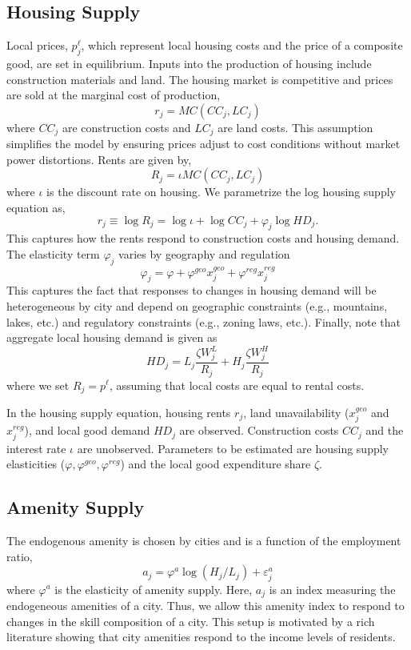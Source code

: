 \documentclass{article}
\begin{document}
\subsection{Housing Supply}
Local prices, $p^\ell_{j}$, which represent local housing costs and the price of a composite good, are set in equilibrium. Inputs into the production of housing include construction materials and land. The housing market is competitive and prices are sold at the marginal cost of production,
$$r_{j} = MC(CC_{j}, LC_{j})$$
where $CC_{j}$ are construction costs and $LC_{j}$ are land costs. This assumption simplifies the model by ensuring prices adjust to cost conditions without market power distortions. Rents are given by,
$$R_{j} = \iota MC(CC_{j},LC_{j})$$
where $\iota$ is the discount rate on housing. We parametrize the log housing supply equation as,
\begin{equation}\label{eq: housing supply}
    r_{j} \equiv \log R_{j} = \log \iota + \log CC_{j} + \varphi_j \log HD_{j}.
\end{equation}
This captures how the rents respond to construction costs and housing demand. The elasticity term $\varphi_j$ varies by geography and regulation
$$\varphi_j = \varphi + \varphi^{geo}x_j^{geo} + \varphi^{reg} x_j^{reg}$$
This captures the fact that responses to changes in housing demand will be heterogeneous by city and depend on geographic constraints (e.g., mountains, lakes, etc.) and regulatory constraints (e.g., zoning laws, etc.). 
Finally, note that aggregate local housing demand is given as
\begin{equation} \label{eq: housing demand}
HD_{j} = L_{j} \frac{\zeta W_{j}^L}{R_{j}} + H_{j} \frac{\zeta W_{j}^H}{R_{j}}
\end{equation}
where we set $R_{j} = p^\ell$, assuming that local costs are equal to rental costs.

In the housing supply equation, housing rents $r_{j}$, land unavailability ($x^{geo}_j$ and $x^{reg}_j$), and local good demand $HD_{j}$ are observed. Construction costs $CC_{j}$ and the interest rate $\iota$ are unobserved. Parameters to be estimated are housing supply elasticities ($\varphi, \varphi^{geo}, \varphi^{reg}$) and the local good expenditure share $\zeta$.   

\subsection{Amenity Supply}
The endogenous amenity is chosen by cities and is a function of the employment ratio,
\begin{equation}\label{eq: amenity supply} 
a_{j} = \varphi^a \log(H_{j}/L_{j}) + \varepsilon^a_{j} \end{equation}
where $\varphi^a$ is the elasticity of amenity supply. Here, $a_{j}$ is an index measuring the endogeneous amenities of a city. Thus, we allow this amenity index to respond to changes in the skill composition of a city. This setup is motivated by a rich literature showing that city amenities respond to the income levels of residents. 
\end{document}
